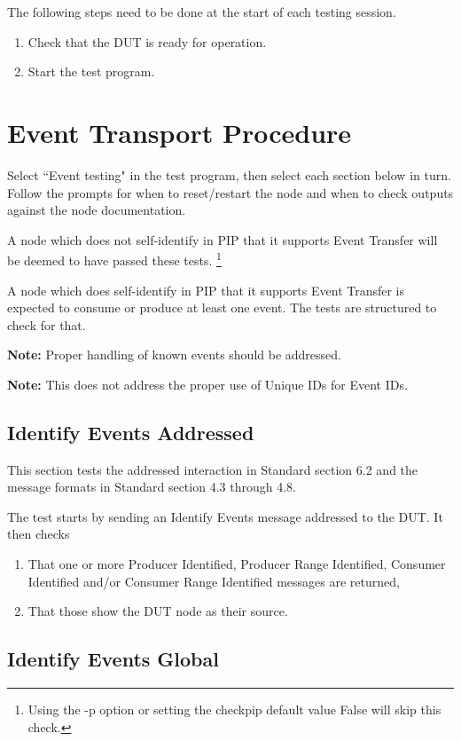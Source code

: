 \documentclass[11pt]{article}
\begin{document}
The following steps need to be done at the start of each testing session.
\begin{enumerate}
\item Check that the DUT is ready for operation.
\item Start the test program.
\end{enumerate}

\section{Event Transport Procedure}

Select ``Event testing" in the test program, 
then select each section below in turn.  Follow the prompts
for when to reset/restart the node and when to check 
outputs against the node documentation.

A node which does not self-identify in PIP that it supports
Event Transfer will be deemed to have passed these tests.
\footnote{Using the -p option or setting the checkpip default value False will skip this check.}

A node which does self-identify in PIP that it supports 
Event Transfer is expected to consume or produce at least 
one event.  The tests are structured to check for that.

\textbf{Note:}  Proper handling of known events should be addressed.

\textbf{Note:}  This does not address the proper use of Unique IDs for Event IDs.

\subsection{Identify Events Addressed}

This section tests the addressed interaction in Standard section 6.2 and
the message formats in Standard section 4.3 through 4.8.

The test starts by sending an Identify Events message addressed to the DUT.
It then checks

\begin{enumerate}
\item That one or more Producer Identified, Producer Range Identified, 
        Consumer Identified and/or Consumer Range Identified messages are returned,
\item That those show the DUT node as their source.
\end{enumerate}

\subsection{Identify Events Global}
\end{document}
